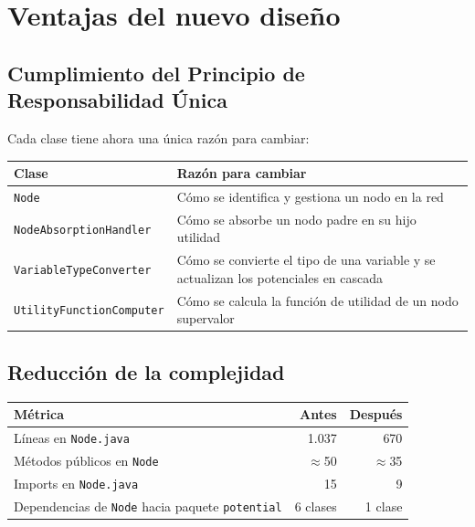 \documentclass[11pt,a4paper]{article}
\newcommand{\code}[1]{\texttt{#1}}
\begin{document}
\section{Ventajas del nuevo dise\~no}

\subsection{Cumplimiento del Principio de Responsabilidad \'Unica}

Cada clase tiene ahora una \'unica raz\'on para cambiar:

\begin{center}
\begin{tabular}{lp{8cm}}
\toprule
\textbf{Clase} & \textbf{Raz\'on para cambiar} \\
\midrule
\code{Node} & C\'omo se identifica y gestiona un nodo en la red \\
\code{NodeAbsorptionHandler} & C\'omo se absorbe un nodo padre en
  su hijo utilidad \\
\code{VariableTypeConverter} & C\'omo se convierte el tipo de una
  variable y se actualizan los potenciales en cascada \\
\code{UtilityFunctionComputer} & C\'omo se calcula la funci\'on de
  utilidad de un nodo supervalor \\
\bottomrule
\end{tabular}
\end{center}

\subsection{Reducci\'on de la complejidad}

\begin{center}
\begin{tabular}{lrr}
\toprule
\textbf{M\'etrica} & \textbf{Antes} & \textbf{Despu\'es} \\
\midrule
L\'ineas en \code{Node.java} & 1.037 & 670 \\
M\'etodos p\'ublicos en \code{Node} & $\approx$50 & $\approx$35 \\
Imports en \code{Node.java} & 15 & 9 \\
Dependencias de \code{Node} hacia paquete \code{potential} & 6 clases & 1 clase \\
\bottomrule
\end{tabular}
\end{center}
\end{document}
